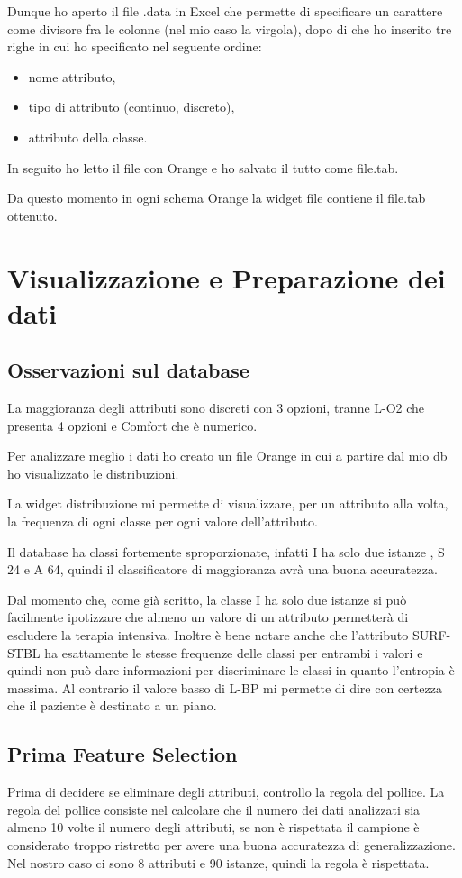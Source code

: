 \documentclass[a4paper, 12p]{report}
\begin{document}
\noindent Dunque ho aperto il file .data in Excel che permette di specificare un carattere come divisore fra le colonne (nel mio caso la virgola), dopo di che ho inserito tre righe in cui ho specificato nel seguente ordine:
\begin{itemize}
\item nome attributo,
\item tipo di attributo (continuo, discreto),
\item attributo della classe. 
\end{itemize}
\noindent In seguito ho letto il file con Orange e ho salvato il tutto come file.tab.

\noindent Da questo momento in ogni schema Orange la widget file contiene il file.tab ottenuto.

\section{Visualizzazione e Preparazione dei dati}

\subsection{Osservazioni sul database}

La maggioranza degli attributi sono discreti con 3 opzioni, tranne L-O2 che presenta 4 opzioni e Comfort che è numerico.

Per analizzare meglio i dati ho creato un  file Orange in cui a partire dal mio db ho visualizzato le distribuzioni.

La widget distribuzione mi permette di visualizzare, per un attributo alla volta, la frequenza di ogni classe per ogni valore dell'attributo. 

Il database ha classi fortemente sproporzionate, infatti I ha solo due istanze , S 24 e A 64, quindi il classificatore di maggioranza avrà una buona accuratezza.

Dal momento che, come già scritto, la classe I ha solo due istanze si può facilmente ipotizzare che almeno un valore di un attributo permetterà di escludere la terapia intensiva. Inoltre è bene notare anche che l'attributo SURF-STBL ha esattamente le stesse frequenze delle classi per entrambi i valori e quindi non può dare informazioni per discriminare le classi in quanto l'entropia è massima. Al contrario il valore basso di L-BP mi permette di dire con certezza che il paziente è destinato a un piano.
\subsection{Prima Feature Selection}
Prima di decidere se eliminare degli attributi, controllo la regola del pollice. La regola del pollice consiste nel calcolare che il numero dei dati analizzati sia almeno 10 volte il numero degli attributi, se non è rispettata il campione è considerato troppo ristretto per avere una buona accuratezza di generalizzazione. Nel nostro caso ci sono 8 attributi e 90 istanze, quindi la regola è rispettata.
\end{document}

